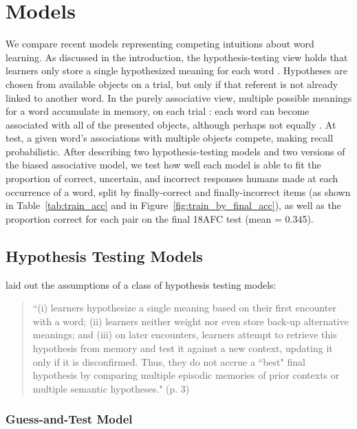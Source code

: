 \documentclass[man,floatsintext]{apa6}
\begin{document}
\section{Models}

We compare recent models representing competing intuitions about word learning. As discussed in the introduction, the hypothesis-testing view holds that learners only store a single hypothesized meaning for each word \citep{Medina:2011,Trueswell:2013}. Hypotheses are chosen from available objects on a trial, but only if that referent is not already linked to another word. In the purely associative view, multiple possible meanings for a word accumulate in memory, on each trial \cite[e.g.,][]{Smith:2000,Yu:2008}: each word can become associated with all of the presented objects, although perhaps not equally \citep{Kachergis:2012gi}.  At test, a given word's associations with multiple objects compete, making recall probabilistic. After describing two hypothesis-testing models and two versions of the biased associative model, we test how well each model is able to fit the proportion of correct, uncertain, and incorrect responses humans made at each occurrence of a word, split by finally-correct and finally-incorrect items (as shown in Table~\ref{tab:train_acc} and in Figure~\ref{fig:train_by_final_acc}), as well as the proportion correct for each pair on the final 18AFC test (mean = 0.345).



\subsection{Hypothesis Testing Models}

\cite{Medina:2011} laid out the assumptions of a class of hypothesis testing models:

\begin{quote}
``(i) learners hypothesize a single meaning based on their first encounter with a word; (ii) learners neither weight nor even store back-up alternative meanings; and (iii) on later encounters, learners attempt to retrieve this hypothesis from memory and test it against a new context, updating it only if it is disconfirmed. Thus, they do not accrue a ``best" final hypothesis by comparing multiple episodic memories of prior contexts or multiple semantic hypotheses." (p. 3)
\end{quote}

\subsubsection{Guess-and-Test Model}
\end{document}
